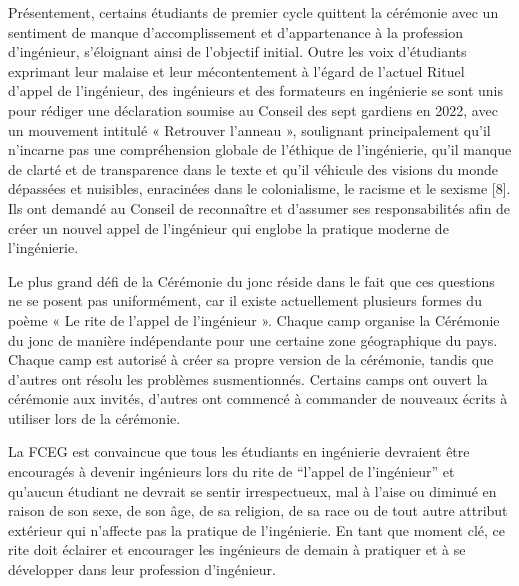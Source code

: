 Présentement, certains étudiants de premier cycle quittent la cérémonie avec un sentiment de manque d'accomplissement et d'appartenance à la profession d'ingénieur, s'éloignant ainsi de l'objectif initial. Outre les voix d'étudiants exprimant leur malaise et leur mécontentement à l'égard de l'actuel Rituel d'appel de l'ingénieur, des ingénieurs et des formateurs en ingénierie se sont unis pour rédiger une déclaration soumise au Conseil des sept gardiens en 2022, avec un mouvement intitulé « Retrouver l'anneau », soulignant principalement qu'il n'incarne pas une compréhension globale de l'éthique de l'ingénierie, qu'il manque de clarté et de transparence dans le texte et qu'il véhicule des visions du monde dépassées et nuisibles, enracinées dans le colonialisme, le racisme et le sexisme [8]. Ils ont demandé au Conseil de reconnaître et d'assumer ses responsabilités afin de créer un nouvel appel de l'ingénieur qui englobe la pratique moderne de l'ingénierie.

Le plus grand défi de la Cérémonie du jonc réside dans le fait que ces questions ne se posent pas uniformément, car il existe actuellement plusieurs formes du poème « Le rite de l'appel de l'ingénieur ». Chaque camp organise la Cérémonie du jonc de manière indépendante pour une certaine zone géographique du pays. Chaque camp est autorisé à créer sa propre version de la cérémonie, tandis que d'autres ont résolu les problèmes susmentionnés. Certains camps ont ouvert la cérémonie aux invités, d'autres ont commencé à commander de nouveaux écrits à utiliser lors de la cérémonie.

La FCEG est convaincue que tous les étudiants en ingénierie devraient être encouragés à devenir ingénieurs lors du rite de ``l'appel de l'ingénieur'' et qu'aucun étudiant ne devrait se sentir irrespectueux, mal à l'aise ou diminué en raison de son sexe, de son âge, de sa religion, de sa race ou de tout autre attribut extérieur qui n'affecte pas la pratique de l'ingénierie. En tant que moment clé, ce rite doit éclairer et encourager les ingénieurs de demain à pratiquer et à se développer dans leur profession d'ingénieur.

